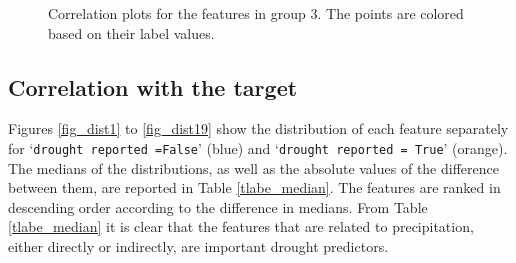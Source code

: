 \documentclass[10pt,parskip=half,
toc=sectionentrywithdots,
bibliography=totocnumbered,
captions=tableheading,numbers=noendperiod]{scrartcl}
\begin{document}
\begin{figure}[H]\begin{center}\end{center}\caption{Correlation plots for the features in group 3. The points are colored
based on their label values.}\label{pairplot3}\end{figure}

\hypertarget{correlation-with-the-target}{%
\subsection{Correlation with the
target}\label{correlation-with-the-target}}

Figures \ref{fig_dist1} to \ref{fig_dist19} show the distribution of
each feature separately for `\texttt{drought\ reported\ =False}' (blue)
and `\texttt{drought\ reported\ =\ True}' (orange). The medians of the
distributions, as well as the absolute values of the difference between
them, are reported in Table \ref{tlabe_median}. The features are ranked
in descending order according to the difference in medians. From Table
\ref{tlabe_median} it is clear that the features that are related to
precipitation, either directly or indirectly, are important drought
predictors.
\end{document}

